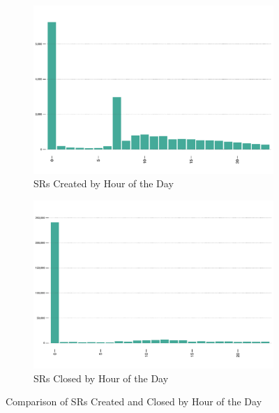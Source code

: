 \documentclass[linenumber]{jdsart}
\begin{document}
\begin{figure}[tbp]
    \centering
    \begin{subfigure}{\textwidth}
        \centering
        \includegraphics[width=\textwidth]{2-year-trend_SRs_created_on_the_hour.pdf}
        \caption{SRs Created by Hour of the Day}
        \label{fig:busiestcreated}
    \end{subfigure}
    \par\medskip
    \begin{subfigure}{\textwidth}
        \centering
        \includegraphics[width=\textwidth]{2-year-trend_SRs_closed_on_the_hour.pdf}
        \caption{SRs Closed by Hour of the Day}
        \label{fig:busiestclosed}
    \end{subfigure}
    \caption{Comparison of SRs Created and Closed by Hour of the Day}
    \label{fig:stacked}
\end{figure}
\end{document}
